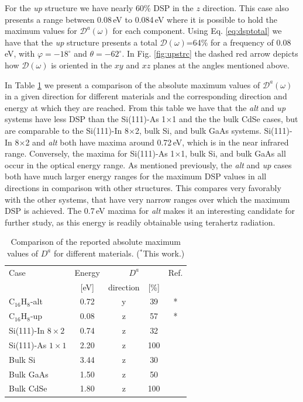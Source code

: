 \documentclass[pss]{wiley2sp} %
\begin{document}
For the \emph{up} structure we have nearly 60\% DSP in the $z$ direction. This
case also presents a range between 0.08\,eV to 0.084\,eV where it is possible
to hold the maximum values for $\mathcal{D}^{a}(\omega)$ for each component.
Using Eq. \eqref{eq:dsptotal} we have that the \emph{up} structure presents a
total $\mathcal{D}(\omega)$=64\% for a frequency of 0.08\,eV, with
$\varphi=-18^{\circ}$ and $\theta=-62^{\circ}$. In Fig. \ref{fig:upstrc} the
dashed red arrow depicts how $\mathcal{D}(\omega)$ is oriented in the $xy$ and
$xz$ planes at the angles mentioned above.

In Table \ref{tab:dacomp} we present a comparison of the absolute maximum
values of $\mathcal{D}^{a}(\omega)$ in a given direction for different
materials and the corresponding direction and energy at which they are
reached. From this table we have that the \emph{alt} and \emph{up} systems
have less DSP than the Si(111)-As 1$\times$1 and the the bulk CdSe cases, but
are comparable to the Si(111)-In 8$\times$2, bulk Si, and bulk GaAs systems.
Si(111)-In 8$\times$2 and \emph{alt} both have maxima around 0.72\,eV, which
is in the near infrared range. Conversely, the maxima for Si(111)-As
1$\times$1, bulk Si, and bulk GaAs all occur in the optical energy range. As
mentioned previously, the \emph{alt} and \emph{up} cases both have much larger
energy ranges for the maximum DSP values in all directions in comparison with
other structures. This compares very favorably with the other systems, that
have very narrow ranges over which the maximum DSP is achieved. The 0.7\,eV
maxima for \emph{alt} makes it an interesting candidate for further study, as
this energy is readily obtainable using terahertz radiation.

\begin{table}[b]
\sidecaption
\begin{tabular}{lcccc}
\hline
Case & Energy &  \multicolumn{2}{c}{$D^{a}$} &  Ref.\\
\cline{3-4}   & [eV]   & direction & [\%] \\
\hline
C$_{16}$H$_{8}$-alt  & 0.72 & y & 39  & * \\
C$_{16}$H$_{8}$-up   & 0.08 & z & 57  & * \\
Si(111)-In $8\times2$& 0.74 & z & 32  & \cite{arzatePRB14}\\
Si(111)-As $1\times1$& 2.20 & z & 100 & \cite{mendozaPRB12}\\
Bulk Si              & 3.44 & z & 30  & \cite{nastosPRB07}\\
Bulk GaAs            & 1.50 & z & 50  & \cite{nastosPRB07,bhatPRB05}\\
Bulk CdSe            & 1.80 & z & 100 & \cite{nastosPRB07}\\
\hline
\end{tabular}
\caption[]{Comparison of the reported absolute maximum values of {$D^{a}$} for
different materials. ($^{*}$This work.)}
\label{tab:dacomp}
\end{table}
\end{document}
